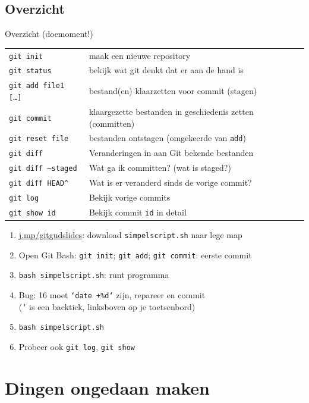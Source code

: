 \subsection{Overzicht}
\begin{frame}{Overzicht (doemoment!)}
	{ \footnotesize
	\begin{tabular}{ll}
		\texttt{git init}						& maak een nieuwe repository \\
		\texttt{git status} 					& bekijk wat git denkt dat er aan de hand is \\
		\texttt{git add file1 [\ldots]}			& bestand(en) klaarzetten voor commit (stagen)	\\
		\texttt{git commit} 					& klaargezette bestanden in geschiedenis zetten (committen)\\
		\texttt{git reset file}		    		& bestanden ontstagen (omgekeerde van \texttt{add})	\\
		\hline
		\texttt{git diff}						& Veranderingen in aan Git bekende bestanden		\\
		\texttt{git diff --staged}				& Wat ga ik committen? (wat is staged?)				\\
		\texttt{git diff HEAD\^}				& Wat is er veranderd sinds de vorige commit?		\\
		\hline
		\texttt{git log}						& Bekijk vorige commits								\\
		\texttt{git show id}					& Bekijk commit \texttt{id} in detail
	\end{tabular}
	}
	{\small
	\begin{enumerate}
		\item \url{j.mp/gitgudslides}: download \texttt{simpelscript.sh} naar lege map
		\item Open Git Bash: \texttt{git init}; \texttt{git add}; \texttt{git commit}: eerste commit
		\item \texttt{bash simpelscript.sh}: runt programma
		\item Bug: 16 moet \texttt{`date +\%d`} zijn, repareer en commit \\
			(\texttt{`} is een backtick, linksboven op je toetsenbord)
		\item \texttt{bash simpelscript.sh}

		\item Probeer ook \texttt{git log}, \texttt{git show}
	\end{enumerate}
	}
\end{frame}

\section[Ongedaan]{Dingen ongedaan maken}

